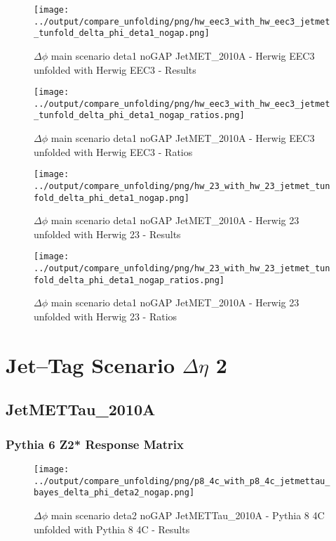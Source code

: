\documentclass[11pt]{book}
\begin{document}
\begin{figure}[ht]
\centering
\texttt{[image: ../output/compare\_unfolding/png/hw\_eec3\_with\_hw\_eec3\_jetmet\_tunfold\_delta\_phi\_deta1\_nogap.png]}
\caption{$\Delta\phi$ main scenario deta1 noGAP JetMET\_2010A - Herwig EEC3 unfolded with Herwig EEC3 - Results}
\label{hw_eec3_hw_eec3_jetmet_tunfold_delta_phi_deta1_nogap_a}
\end{figure}

\begin{figure}[ht]
\centering
\texttt{[image: ../output/compare\_unfolding/png/hw\_eec3\_with\_hw\_eec3\_jetmet\_tunfold\_delta\_phi\_deta1\_nogap\_ratios.png]}
\caption{$\Delta\phi$ main scenario deta1 noGAP JetMET\_2010A - Herwig EEC3 unfolded with Herwig EEC3 - Ratios}
\label{hw_eec3_hw_eec3_jetmet_tunfold_delta_phi_deta1_nogap_b}
\end{figure}

\begin{figure}[ht]
\centering
\texttt{[image: ../output/compare\_unfolding/png/hw\_23\_with\_hw\_23\_jetmet\_tunfold\_delta\_phi\_deta1\_nogap.png]}
\caption{$\Delta\phi$ main scenario deta1 noGAP JetMET\_2010A - Herwig 23 unfolded with Herwig 23 - Results}
\label{hw_23_hw_23_jetmet_tunfold_delta_phi_deta1_nogap_a}
\end{figure}

\begin{figure}[ht]
\centering
\texttt{[image: ../output/compare\_unfolding/png/hw\_23\_with\_hw\_23\_jetmet\_tunfold\_delta\_phi\_deta1\_nogap\_ratios.png]}
\caption{$\Delta\phi$ main scenario deta1 noGAP JetMET\_2010A - Herwig 23 unfolded with Herwig 23 - Ratios}
\label{hw_23_hw_23_jetmet_tunfold_delta_phi_deta1_nogap_b}
\end{figure}




\newpage
\chapter{Jet--Tag Scenario $\Delta\eta$ 2}
\section{JetMETTau\_2010A}
\subsection{Pythia 6 Z2* Response Matrix}



\begin{figure}[ht]
\centering
\texttt{[image: ../output/compare\_unfolding/png/p8\_4c\_with\_p8\_4c\_jetmettau\_bayes\_delta\_phi\_deta2\_nogap.png]}
\caption{$\Delta\phi$ main scenario deta2 noGAP JetMETTau\_2010A - Pythia 8 4C unfolded with Pythia 8 4C - Results}
\label{p8_p8_jetmettau_bayes_delta_phi_deta2_nogap_a}
\end{figure}
\end{document}

